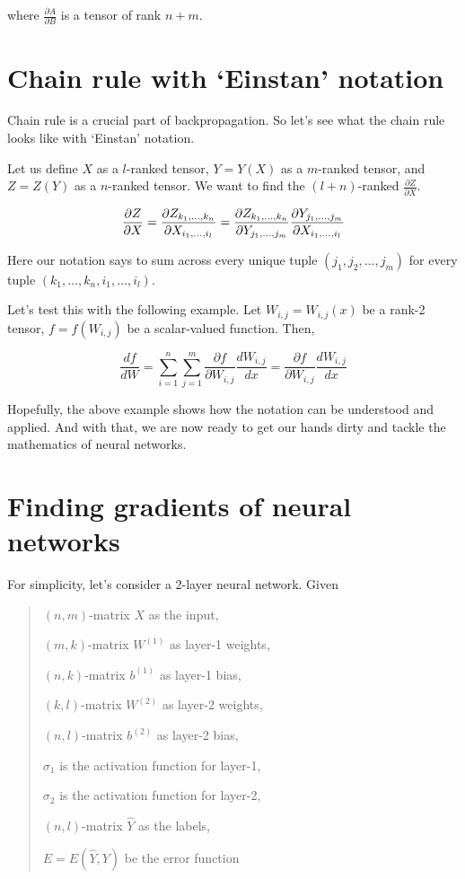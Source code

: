 \documentclass{article}
\begin{document}
where \(\frac{\partial A}{\partial B}\) is a tensor of rank \(n + m\).

\section{Chain rule with `Einstan' notation}

Chain rule is a crucial part of backpropagation. So let's see what the chain rule looks like with `Einstan' notation.

Let us define \(X\) as a \(l\)-ranked tensor, \(Y = Y(X)\) as a \(m\)-ranked tensor, and \(Z = Z(Y)\) as a \(n\)-ranked tensor. We want to find the \((l + n)\)-ranked \(\frac{\partial Z}{\partial X}\).

\[\frac{\partial Z}{\partial X} 
= \frac{\partial Z_{k_1, \dots, k_n}}{\partial X_{i_1, \dots, i_l}} \\
= \frac{\partial Z_{k_1, \dots, k_n}}{\partial Y_{j_1, \dots, j_m}}
\frac{\partial Y_{j_1, \dots, j_m}}{\partial X_{i_1, \dots, i_l}}
\]

Here our notation says to sum across every unique tuple \((j_1, j_2, \dots, j_m)\) for every tuple \((k_1, \dots, k_n, i_1, \dots, i_l)\). 

Let's test this with the following example. Let \(W_{i,j} = W_{i, j}(x)\) be a rank-2 tensor, \(f = f(W_{i, j})\) be a scalar-valued function. Then,

\[ \frac{df}{dW} = \sum_{i=1}^n \sum_{j=1}^m \frac{\partial f}{\partial W_{i, j}} \frac{dW_{i, j}}{dx}
= \frac{\partial f}{\partial W_{i, j}} \frac{dW_{i, j}}{dx} 
\]

Hopefully, the above example shows how the notation can be understood and applied. And with that, we are now ready to get our hands dirty and tackle the mathematics of neural networks.

\section{Finding gradients of neural networks}

For simplicity, let's consider a 2-layer neural network. Given \begin{quote}
    \((n, m)\)-matrix \(X\) as the input,
    
    \((m, k)\)-matrix \(W^{(1)}\) as layer-1 weights,
    
    \((n, k)\)-matrix \(b^{(1)}\) as layer-1 bias,

    \((k, l)\)-matrix \(W^{(2)}\) as layer-2 weights,
    
    \((n, l)\)-matrix \(b^{(2)}\) as layer-2 bias,

    \(\sigma_1\) is the activation function for layer-1,
    
    \(\sigma_2\) is the activation function for layer-2,

    \((n, l)\)-matrix \(\hat{Y}\) as the labels,

    \(E = E(\hat{Y}, Y)\) be the error function
    
\end{quote}
\end{document}
